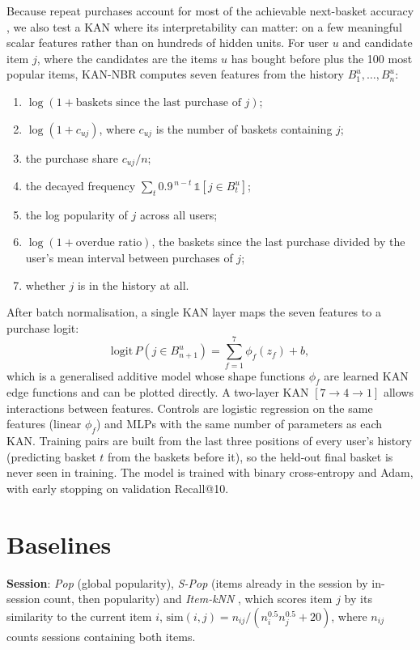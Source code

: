 \documentclass[12pt,a4paper]{report}
\begin{document}
Because repeat purchases account for most of the achievable next-basket
accuracy \cite{li2023}, we also test a KAN where its interpretability can matter:
on a few meaningful scalar features rather than on hundreds of hidden units.
For user $u$ and candidate item $j$, where the candidates are the items $u$ has
bought before plus the 100 most popular items, KAN-NBR computes seven features
from the history $B^u_1, \ldots, B^u_n$:

\begin{enumerate}
    \item $\log(1 + \text{baskets since the last purchase of } j)$;
    \item $\log(1 + c_{uj})$, where $c_{uj}$ is the number of baskets containing $j$;
    \item the purchase share $c_{uj}/n$;
    \item the decayed frequency $\sum_t 0.9^{\,n-t}\, \mathbb{1}[j \in B^u_t]$;
    \item the log popularity of $j$ across all users;
    \item $\log(1 + \text{overdue ratio})$, the baskets since the last purchase
          divided by the user's mean interval between purchases of $j$;
    \item whether $j$ is in the history at all.
\end{enumerate}

After batch normalisation, a single KAN layer maps the seven features to a
purchase logit:
\begin{equation}
\mathrm{logit}\, P(j \in B^u_{n+1}) = \sum_{f=1}^{7} \phi_f(z_f) + b,
\end{equation}
which is a generalised additive model whose shape functions $\phi_f$ are learned
KAN edge functions and can be plotted directly. A two-layer KAN
$[7 \to 4 \to 1]$ allows interactions between features. Controls are logistic
regression on the same features (linear $\phi_f$) and MLPs with the same number
of parameters as each KAN. Training pairs are built from the last three positions
of every user's history (predicting basket $t$ from the baskets before it), so
the held-out final basket is never seen in training. The model is trained with
binary cross-entropy and Adam, with early stopping on validation Recall@10.

\section{Baselines}

\textbf{Session}: \emph{Pop} (global popularity), \emph{S-Pop} (items already in
the session by in-session count, then popularity) and \emph{Item-kNN}
\cite{hidasi2016}, which scores item $j$ by its similarity to the current item $i$,
$\mathrm{sim}(i,j) = n_{ij} / (n_i^{0.5} n_j^{0.5} + 20)$, where $n_{ij}$ counts
sessions containing both items.
\end{document}
